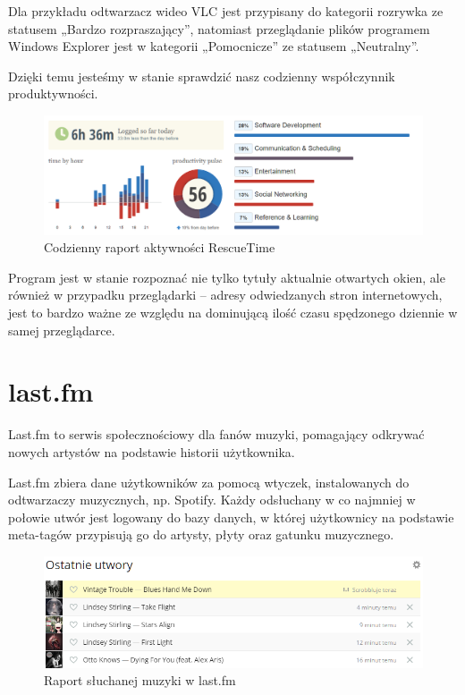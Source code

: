 \documentclass[brudnopis]{xmgr}
\begin{document}
        Dla przykładu odtwarzacz wideo VLC jest przypisany do kategorii rozrywka ze statusem „Bardzo rozpraszający”,
        natomiast przeglądanie plików programem Windows Explorer jest w kategorii „Pomocnicze” ze statusem „Neutralny”.

        Dzięki temu jesteśmy w stanie sprawdzić nasz codzienny współczynnik produktywności.

        \begin{figure}
          \includegraphics[width=\linewidth]{fig/rescuetime-daily-dashboard.png}
          \caption{Codzienny raport aktywności RescueTime}
          \label{fig:RescueTime}
        \end{figure}

        Program jest w stanie rozpoznać nie tylko tytuły aktualnie otwartych okien,
        ale również w przypadku przeglądarki – adresy odwiedzanych stron internetowych,
        jest to bardzo ważne ze względu na dominującą ilość czasu spędzonego dziennie w samej przeglądarce.

        \section*{last.fm}

        Last.fm to serwis społecznościowy dla fanów muzyki,
        pomagający odkrywać nowych artystów na podstawie historii użytkownika.

        Last.fm zbiera dane użytkowników za pomocą wtyczek, instalowanych do odtwarzaczy muzycznych, np. Spotify.
        Każdy odsłuchany w co najmniej w połowie utwór jest logowany do bazy danych,
        w której użytkownicy na podstawie meta-tagów przypisują go do artysty, płyty oraz gatunku muzycznego.

        \begin{figure}
          \includegraphics[width=\linewidth]{fig/lastfm-now-listening.png}
          \caption{Raport słuchanej muzyki w last.fm}
          \label{fig:Last.fm}
        \end{figure}
\end{document}
